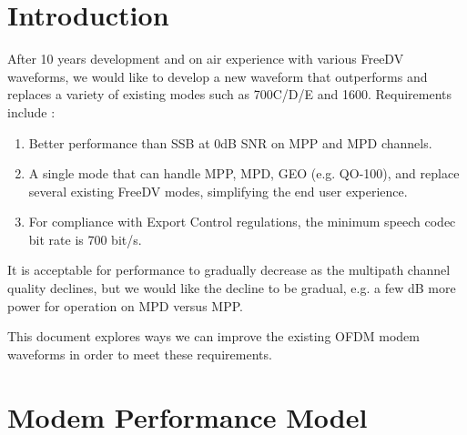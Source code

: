 \documentclass{article}
\begin{document}

\section{Introduction}

After 10 years development and on air experience with various FreeDV waveforms, we would like to develop a new waveform that outperforms and replaces a variety of existing modes such as 700C/D/E and 1600.  Requirements include \cite{freedv-020}:
\begin{enumerate}
\item Better performance than SSB at 0dB SNR on MPP and MPD channels.
\item A single mode that can handle MPP, MPD, GEO (e.g. QO-100), and replace several existing FreeDV modes, simplifying the end user experience.
\item For compliance with Export Control regulations, the minimum speech codec bit rate is 700 bit/s.
\end{enumerate}
It is acceptable for performance to gradually decrease as the multipath channel quality declines, but we would like the decline to be gradual, e.g. a few dB more power for operation on MPD versus MPP.

This document explores ways we can improve the existing OFDM modem waveforms in order to meet these requirements.

\section{Modem Performance Model}
\end{document}
